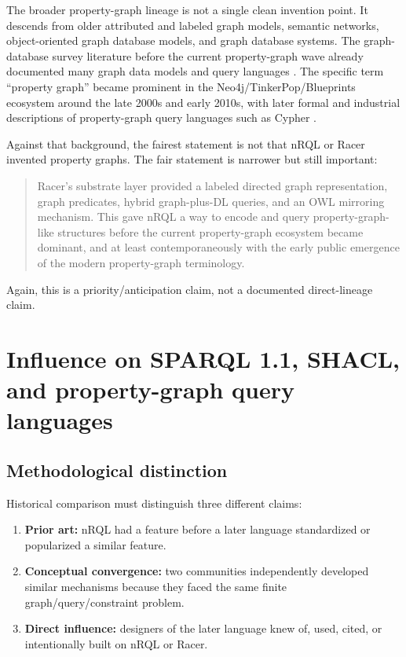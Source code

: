 \documentclass[11pt,letterpaper]{article}
\newcommand{\nrql}{nRQL}
\newcommand{\owl}{OWL}
\begin{document}
The broader property-graph lineage is not a single clean invention point. It descends from older attributed and labeled graph models, semantic networks, object-oriented graph database models, and graph database systems. The graph-database survey literature before the current property-graph wave already documented many graph data models and query languages \cite{angles2008}. The specific term ``property graph'' became prominent in the Neo4j/TinkerPop/Blueprints ecosystem around the late 2000s and early 2010s, with later formal and industrial descriptions of property-graph query languages such as Cypher \cite{rodriguez2010,cypher2018}.

Against that background, the fairest statement is not that \nrql{} or Racer invented property graphs. The fair statement is narrower but still important:

\begin{quote}
Racer's substrate layer provided a labeled directed graph representation, graph predicates, hybrid graph-plus-DL queries, and an \owl{} mirroring mechanism. This gave \nrql{} a way to encode and query property-graph-like structures before the current property-graph ecosystem became dominant, and at least contemporaneously with the early public emergence of the modern property-graph terminology.
\end{quote}

Again, this is a priority/anticipation claim, not a documented direct-lineage claim.

\section{Influence on SPARQL 1.1, SHACL, and property-graph query languages}

\subsection{Methodological distinction}

Historical comparison must distinguish three different claims:

\begin{enumerate}[leftmargin=2em]
  \item \textbf{Prior art:} \nrql{} had a feature before a later language standardized or popularized a similar feature.
  \item \textbf{Conceptual convergence:} two communities independently developed similar mechanisms because they faced the same finite graph/query/constraint problem.
  \item \textbf{Direct influence:} designers of the later language knew of, used, cited, or intentionally built on \nrql{} or Racer.
\end{enumerate}
\end{document}
